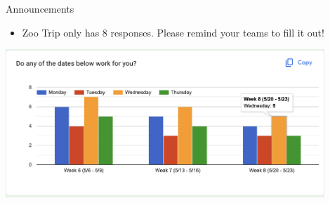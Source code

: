
\begin{frame}{Announcements}
    \begin{itemize}
        \item Zoo Trip only has 8 responses. Please remind your teams to fill it out!
    \end{itemize}
    \includegraphics[width=0.9\textwidth]{images/ZooTripResponses.png}
\end{frame}

